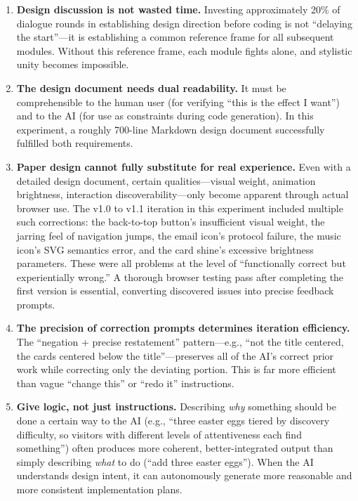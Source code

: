 \begin{enumerate}
    \item \textbf{Design discussion is not wasted time.} Investing approximately 20\% of dialogue rounds in establishing design direction before coding is not ``delaying the start''---it is establishing a common reference frame for all subsequent modules. Without this reference frame, each module fights alone, and stylistic unity becomes impossible.

    \item \textbf{The design document needs dual readability.} It must be comprehensible to the human user (for verifying ``this is the effect I want'') and to the AI (for use as constraints during code generation). In this experiment, a roughly 700-line Markdown design document successfully fulfilled both requirements.

    \item \textbf{Paper design cannot fully substitute for real experience.} Even with a detailed design document, certain qualities---visual weight, animation brightness, interaction discoverability---only become apparent through actual browser use. The v1.0 to v1.1 iteration in this experiment included multiple such corrections: the back-to-top button's insufficient visual weight, the jarring feel of navigation jumps, the email icon's protocol failure, the music icon's SVG semantics error, and the card shine's excessive brightness parameters. These were all problems at the level of ``functionally correct but experientially wrong.'' A thorough browser testing pass after completing the first version is essential, converting discovered issues into precise feedback prompts.

    \item \textbf{The precision of correction prompts determines iteration efficiency.} The ``negation + precise restatement'' pattern---e.g., ``not the title centered, the cards centered below the title''---preserves all of the AI's correct prior work while correcting only the deviating portion. This is far more efficient than vague ``change this'' or ``redo it'' instructions.

    \item \textbf{Give logic, not just instructions.} Describing \textit{why} something should be done a certain way to the AI (e.g., ``three easter eggs tiered by discovery difficulty, so visitors with different levels of attentiveness each find something'') often produces more coherent, better-integrated output than simply describing \textit{what} to do (``add three easter eggs''). When the AI understands design intent, it can autonomously generate more reasonable and more consistent implementation plans.
\end{enumerate}

